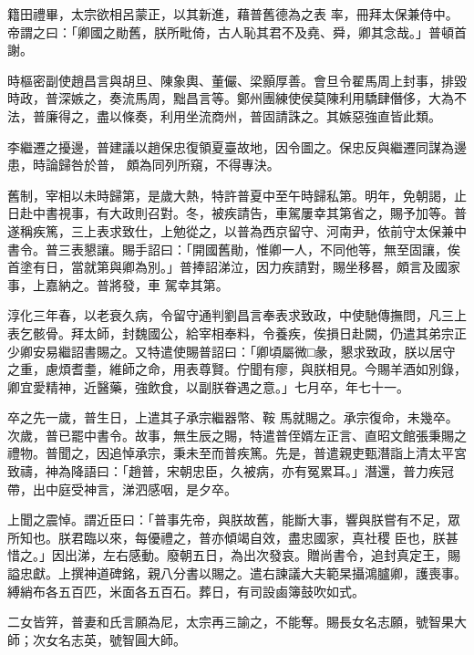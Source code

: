 \begin{pinyinscope}
 籍田禮畢，太宗欲相呂蒙正，以其新進，藉普舊德為之表
 率，冊拜太保兼侍中。帝謂之曰：「卿國之勛舊，朕所毗倚，古人恥其君不及堯、舜，卿其念哉。」普頓首謝。



 時樞密副使趙昌言與胡旦、陳象輿、董儼、梁顥厚善。會旦令翟馬周上封事，排毀時政，普深嫉之，奏流馬周，黜昌言等。鄭州團練使侯莫陳利用驕肆僭侈，大為不法，普廉得之，盡以條奏，利用坐流商州，普固請誅之。其嫉惡強直皆此類。



 李繼遷之擾邊，普建議以趙保忠復領夏臺故地，因令圖之。保忠反與繼遷同謀為邊患，時論歸咎於普，
 頗為同列所窺，不得專決。



 舊制，宰相以未時歸第，是歲大熱，特許普夏中至午時歸私第。明年，免朝謁，止日赴中書視事，有大政則召對。冬，被疾請告，車駕屢幸其第省之，賜予加等。普遂稱疾篤，三上表求致仕，上勉從之，以普為西京留守、河南尹，依前守太保兼中書令。普三表懇讓。賜手詔曰：「開國舊勛，惟卿一人，不同他等，無至固讓，俟首塗有日，當就第與卿為別。」普捧詔涕泣，因力疾請對，賜坐移晷，頗言及國家事，上嘉納之。普將發，車
 駕幸其第。



 淳化三年春，以老衰久病，令留守通判劉昌言奉表求致政，中使馳傳撫問，凡三上表乞骸骨。拜太師，封魏國公，給宰相奉料，令養疾，俟損日赴闕，仍遣其弟宗正少卿安易繼詔書賜之。又特遣使賜普詔曰：「卿頃屬微□彖，懇求致政，朕以居守之重，慮煩耆耋，維師之命，用表尊賢。佇聞有瘳，與朕相見。今賜羊酒如別錄，卿宜愛精神，近醫藥，強飲食，以副朕眷遇之意。」七月卒，年七十一。



 卒之先一歲，普生日，上遣其子承宗繼器幣、鞍
 馬就賜之。承宗復命，未幾卒。次歲，普已罷中書令。故事，無生辰之賜，特遣普侄婿左正言、直昭文館張秉賜之禮物。普聞之，因追悼承宗，秉未至而普疾篤。先是，普遣親吏甄潛詣上清太平宮致禱，神為降語曰：「趙普，宋朝忠臣，久被病，亦有冤累耳。」潛還，普力疾冠帶，出中庭受神言，涕泗感咽，是夕卒。



 上聞之震悼。謂近臣曰：「普事先帝，與朕故舊，能斷大事，響與朕嘗有不足，眾所知也。朕君臨以來，每優禮之，普亦傾竭自效，盡忠國家，真社稷
 臣也，朕甚惜之。」因出涕，左右感動。廢朝五日，為出次發哀。贈尚書令，追封真定王，賜謚忠獻。上撰神道碑銘，親八分書以賜之。遣右諫議大夫範杲攝鴻臚卿，護喪事。縛綃布各五百匹，米面各五百石。葬日，有司設鹵簿鼓吹如式。



 二女皆笄，普妻和氏言願為尼，太宗再三諭之，不能奪。賜長女名志願，號智果大師；次女名志英，號智圓大師。




\end{pinyinscope}
